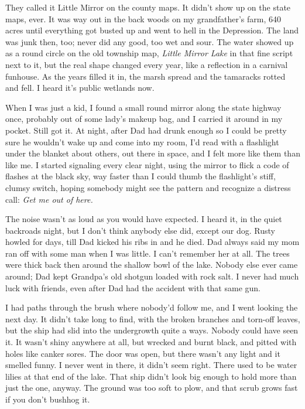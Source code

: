 
They called it Little Mirror on the county maps. It didn't show up on
the state maps, ever. It was way out in the back woods on my
grandfather's farm, 640 acres until everything got busted up and went to
hell in the Depression. The land was junk then, too; never did any good,
too wet and sour. The water showed up as a round circle on the old
township map, \emph{Little Mirror Lake} in that fine script next to it,
but the real shape changed every year, like a reflection in a carnival
funhouse. As the years filled it in, the marsh spread and the tamaracks
rotted and fell. I heard it's public wetlands now.

When I was just a kid, I found a small round mirror along the state
highway once, probably out of some lady's makeup bag, and I carried it
around in my pocket. Still got it. At night, after Dad had drunk enough
so I could be pretty sure he wouldn't wake up and come into my room, I'd
read with a flashlight under the blanket about others, out there in
space, and I felt more like them than like me. I started signaling every
clear night, using the mirror to flick a code of flashes at the black
sky, way faster than I could thumb the flashlight's stiff, clumsy
switch, hoping somebody might see the pattern and recognize a distress
call: \emph{Get me out of here.}

The noise wasn't as loud as you would have expected. I heard it, in the
quiet backroads night, but I don't think anybody else did, except our
dog. Rusty howled for days, till Dad kicked his ribs in and he died. Dad
always said my mom ran off with some man when I was little. I can't
remember her at all. The trees were thick back then around the shallow
bowl of the lake. Nobody else ever came around; Dad kept Grandpa's old
shotgun loaded with rock salt. I never had much luck with friends, even
after Dad had the accident with that same gun.

I had paths through the brush where nobody'd follow me, and I went
looking the next day. It didn't take long to find, with the broken
branches and torn-off leaves, but the ship had slid into the undergrowth
quite a ways. Nobody could have seen it. It wasn't shiny anywhere at
all, but wrecked and burnt black, and pitted with holes like canker
sores. The door was open, but there wasn't any light and it smelled
funny. I never went in there, it didn't seem right. There used to be
water lilies at that end of the lake. That ship didn't look big enough
to hold more than just the one, anyway. The ground was too soft to plow,
and that scrub grows fast if you don't bushhog it.

